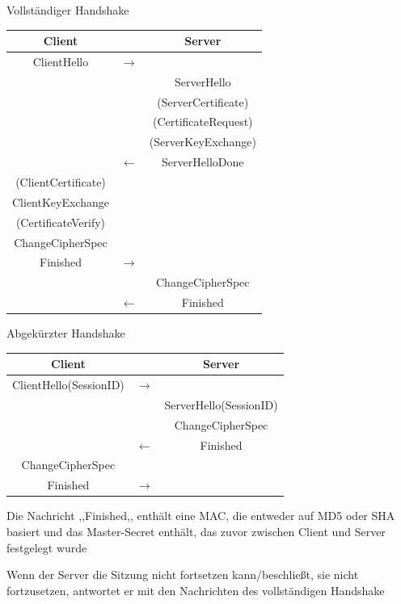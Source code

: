 \documentclass[a4paper]{article}
\begin{document}
\begin{multicols}{3}
      Vollständiger Handshake
      \begin{tabular}{c|c|c}
            Client              &               & Server               \\\hline
            ClientHello         & $\rightarrow$ &                      \\
                                &               & ServerHello          \\
                                &               & (ServerCertificate)  \\
                                &               & (CertificateRequest) \\
                                &               & (ServerKeyExchange)  \\
                                & $\leftarrow$  & ServerHelloDone      \\
            (ClientCertificate) &               &                      \\
            ClientKeyExchange   &               &                      \\
            (CertificateVerify) &               &                      \\
            ChangeCipherSpec    &               &                      \\
            Finished            & $\rightarrow$ &                      \\
                                &               & ChangeCipherSpec     \\
                                & $\leftarrow$  & Finished
      \end{tabular}

      Abgekürzter Handshake
      \begin{tabular}{c|c|c}
            Client                 &               & Server                 \\\hline
            ClientHello(SessionID) & $\rightarrow$ &                        \\
                                   &               & ServerHello(SessionID) \\
                                   &               & ChangeCipherSpec       \\
                                   & $\leftarrow$  & Finished               \\
            ChangeCipherSpec       &               &                        \\
            Finished               & $\rightarrow$ &
      \end{tabular}
      \begin{itemize*}
            \item Die Nachricht ,,Finished,, enthält eine MAC, die entweder auf MD5 oder SHA basiert und das Master-Secret enthält, das zuvor zwischen Client und Server festgelegt wurde
            \item Wenn der Server die Sitzung nicht fortsetzen kann/beschließt, sie nicht fortzusetzen, antwortet er mit den Nachrichten des vollständigen Handshake
      \end{itemize*}


\end{multicols}
\end{document}
